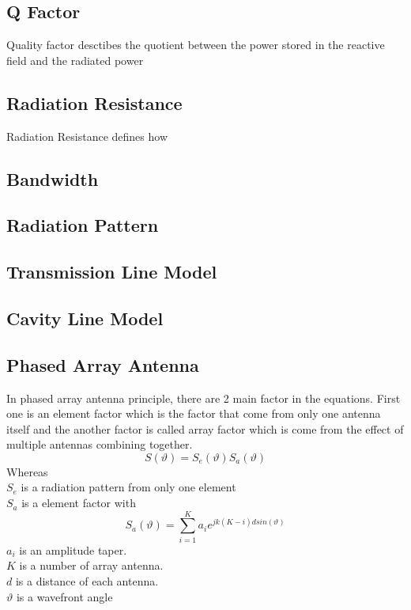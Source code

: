 \documentclass[11pt,a4paper]{article}
\begin{document}
    \subsection{Q Factor}
    \indent Quality factor desctibes the quotient between the power stored in the reactive field and the radiated power
    \subsection{Radiation Resistance}
      \indent Radiation Resistance defines how 

    \subsection{Bandwidth}

    \subsection{Radiation Pattern}

    \subsection{Transmission Line Model}

    \subsection{Cavity Line Model}

    \subsection{Phased Array Antenna}
      In phased array antenna principle, there are 2 main factor in the equations. First one is an element factor which is the factor that come from only one antenna itself and the another factor is called array factor which is come from the effect of multiple antennas combining together.
      \begin{equation} 
        S(\vartheta)=S_{e}(\vartheta)S_a(\vartheta)  \label{ii}
      \end{equation}
        Whereas \\[1ex]
        \indent $S_{e}$ is a radiation pattern from only one element\\
        \indent $S_{a}$ is a element factor with
        \begin{equation} 
          S_{a}(\vartheta) = \sum\limits_{i=1}^K a_{i}e^{jk(K-i)dsin(\vartheta)}
        \end{equation}
        \indent $a_{i}$ is an amplitude taper.\\
        \indent $K$ is a number of array antenna.\\
        \indent $d$ is a distance of each antenna.\\
        \indent $\vartheta$ is a wavefront angle
\end{document}
